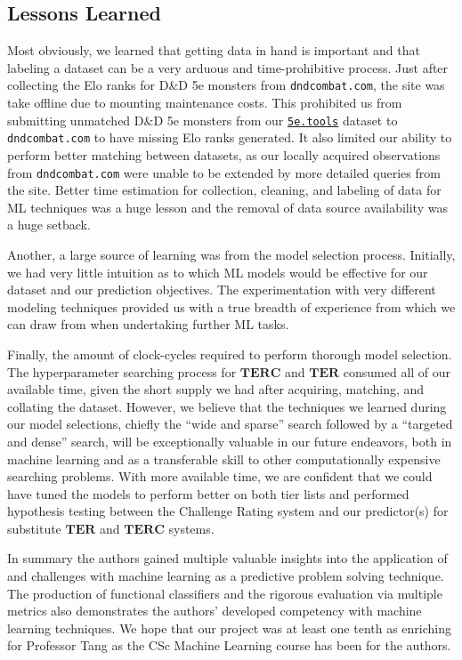 \documentclass{article}
\newcommand{\Qty}[1]{\oldstylenums{#1}}
\newcommand{\TER}{\ensuremath{\mathbf{TER}}\xspace}
\newcommand{\TERC}{\ensuremath{\mathbf{TERC}}\xspace}
\newcommand{\DnD}{D\&D 5e\xspace}
\newcommand{\FiveETools}{\href{https://5etools-mirror-1.github.io/}{\texttt{5e.tools}}\xspace}
\newcommand{\DnDCombat}{\texttt{dndcombat.com}\xspace}
\begin{document}
\hypertarget{future-work}{%
\subsection{Lessons Learned}}

Most obviously, we learned that getting data in hand is important and that labeling a dataset can be a very arduous  and time-prohibitive process.
Just after collecting the Elo ranks for \DnD monsters from \DnDCombat, the site was take offline due to mounting maintenance costs.
This prohibited us from submitting unmatched \DnD monsters from our \FiveETools dataset to \DnDCombat to have missing Elo ranks generated.
It also limited our ability to perform better matching between datasets, as our locally acquired observations from \DnDCombat were unable to be extended by more detailed queries from the site.
Better time estimation for collection, cleaning, and labeling of data for ML techniques was a huge lesson and the removal of data source availability was a huge setback.

Another, a large source of learning was from the model selection process.
Initially, we had very little intuition as to which ML models would be effective for our dataset and our prediction objectives.
The experimentation with \Qty{10} very different modeling techniques provided us with a true breadth of experience from which we can draw from when undertaking further ML tasks.

Finally, the amount of clock-cycles required to perform thorough model selection.
The hyperparameter searching process for \TERC and \TER consumed all of our available time, given the short supply we had after acquiring, matching, and collating the dataset.
However, we believe that the techniques we learned during our model selections, chiefly the ``wide and sparse'' search followed by a ``targeted and dense'' search, will be exceptionally valuable in our future endeavors, both in machine learning and as a transferable skill to other computationally expensive searching problems.
With more available time, we are confident that we could have tuned the models to perform better on  both tier lists and performed hypothesis testing between the Challenge Rating system and our predictor(s) for substitute \TER and \TERC systems.

In summary the authors gained multiple valuable insights into the application of and challenges with machine learning as a predictive problem solving technique.
The production of functional classifiers and the rigorous evaluation via multiple metrics also demonstrates the authors' developed competency with machine learning techniques.
We hope that our project was at least one tenth as enriching for Professor Tang as the CSc \Qty{74020} Machine Learning course has been for the authors.
\end{document}
